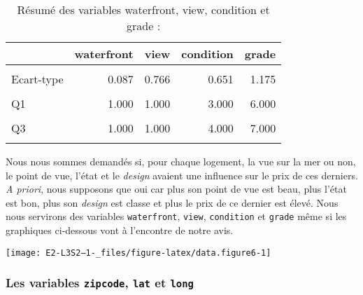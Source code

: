 \documentclass[
  11pt,
  french,
]{article}
\begin{document}
\begin{table}[!h]

\caption{\label{tab:unnamed-chunk-8}Résumé des variables waterfront, view, condition et grade :}
\centering
\begin{tabular}[t]{lrrrr}
\toprule
  & waterfront & view & condition & grade\\
\midrule
\cellcolor{gray!6}{Moyenne} & \cellcolor{gray!6}{1.008} & \cellcolor{gray!6}{1.234} & \cellcolor{gray!6}{3.409} & \cellcolor{gray!6}{6.657}\\
Ecart-type & 0.087 & 0.766 & 0.651 & 1.175\\
\cellcolor{gray!6}{Minimum} & \cellcolor{gray!6}{1.000} & \cellcolor{gray!6}{1.000} & \cellcolor{gray!6}{1.000} & \cellcolor{gray!6}{1.000}\\
Q1 & 1.000 & 1.000 & 3.000 & 6.000\\
\cellcolor{gray!6}{Q2} & \cellcolor{gray!6}{1.000} & \cellcolor{gray!6}{1.000} & \cellcolor{gray!6}{3.000} & \cellcolor{gray!6}{6.000}\\
\addlinespace
Q3 & 1.000 & 1.000 & 4.000 & 7.000\\
\cellcolor{gray!6}{Maximum} & \cellcolor{gray!6}{2.000} & \cellcolor{gray!6}{5.000} & \cellcolor{gray!6}{5.000} & \cellcolor{gray!6}{12.000}\\
\bottomrule
\end{tabular}
\end{table}

Nous nous sommes demandés si, pour chaque logement, la vue sur la mer ou
non, le point de vue, l'état et le \textit{design} avaient une influence
sur le prix de ces derniers. \textit{A priori}, nous supposons que oui
car plus son point de vue est beau, plus l'état est bon, plus son
\textit{design} est classe et plus le prix de ce dernier est élevé. Nous
nous servirons des variables \texttt{waterfront}, \texttt{view},
\texttt{condition} et \texttt{grade} même si les graphiques ci-dessous
vont à l'encontre de notre avis.

\begin{center}\texttt{[image: E2-L3S2--1-\_files/figure-latex/data.figure6-1]} \end{center}

\newpage

\hypertarget{les-variables-zipcode-lat-et-long}{%
\subsubsection{\texorpdfstring{Les variables \texttt{zipcode},
\texttt{lat} et
\texttt{long}}{Les variables zipcode, lat et long}}\label{les-variables-zipcode-lat-et-long}}
\end{document}
